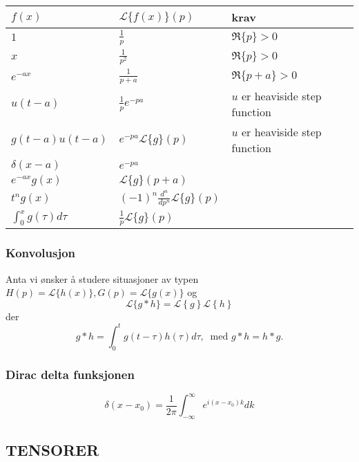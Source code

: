 \documentclass[a4paper, norsk, 8pt]{article}
\newcommand{\DIFF}[2]{ \frac{d#1}{d#2} }
\begin{document}
\begin{multicols*}{2}
\begin{tabular}{|l l l|}
\hline
$f(x)$ 			& $\mathcal{L}\{f(x)\}(p)$ 		& krav \\ \hline
$1$    			& $\frac{1}{p}$ 				& $\Re\{p\}>0$  \\
$x$    			& $\frac{1}{p^2}$ 				& $\Re\{p\}>0$  \\
$e^{-ax}$ 		& $\frac{1}{p+a}$ 				& $\Re\{p+a\}>0$ \\
$u(t-a)$ 		& $\frac{1}{p}e^{-pa}$ 			& $u$ er heaviside step function \\
$g(t-a)u(t-a)$ 	& $e^{-pa}\mathcal{L}\{g\}(p)$  & $u$ er heaviside step function \\
$\delta(x-a)$ 	& $e^{-pa}$ 					& \\
$e^{-ax}g(x)$ 	& $\mathcal{L}\{g\}(p+a)$ 	& \\
$t^n g(x)$ 		& $(-1)^n\DIFF{^n}{p^n}\mathcal{L}\{g\}(p)$ 	& \\
$\int_0^x g(\tau)d\tau$ 	& $\frac{1}{p}\mathcal{L}\{g\}(p)$ 	& \\ 
\hline
\end{tabular}

\subsubsection*{\small Konvolusjon}
Anta vi ønsker å studere situasjoner av typen $H(p)=\mathcal{L}\{h(x)\},G(p)=\mathcal{L}\{g(x)\}$ og 
\[
\mathcal{L}\{g*h\}=\mathcal{L}\left\{g\right\} \mathcal{L}\left\{h\right\}
\]
der 
\[
g*h=\int_0^t g(t-\tau)h(\tau)d\tau, \ \mbox{ med } g*h=h*g. 
\]

\subsubsection*{\small Dirac delta funksjonen}
\[
\delta(x-x_0)=\frac{1}{2\pi}\int_{-\infty}^{\infty}e^{i(x-x_0)k}dk
\]


\subsection*{\footnotesize TENSORER }

\end{multicols*}
\end{document}
